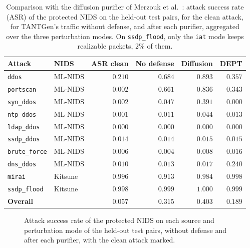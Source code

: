 \begin{table}[t]
\centering
\caption[Comparison with the diffusion purifier of Merzouk et al.]{Comparison with the
diffusion purifier of Merzouk et al.~\cite{merzouk2024diffusion}: attack success rate
(ASR) of the protected NIDS on the held-out test pairs, for the clean attack, for
TANTGen's traffic without defense, and after each purifier, aggregated over the three
perturbation modes. On \texttt{ssdp\_flood}, only the \texttt{iat} mode keeps realizable
packets, $2\%$ of them.}
\label{tab:eval-sota}
\setlength{\tabcolsep}{5pt}
\begin{tabular}{llrrrr}
\toprule
\textbf{Attack} & \textbf{NIDS} & \textbf{ASR clean} & \textbf{No defense} & \textbf{Diffusion} & \textbf{DEPT} \\
\midrule
\texttt{ddos}         & ML-NIDS & $0.210$ & $0.684$ & $0.893$ & $0.357$ \\
\texttt{portscan}     & ML-NIDS & $0.002$ & $0.661$ & $0.836$ & $0.343$ \\
\texttt{syn\_ddos}    & ML-NIDS & $0.002$ & $0.047$ & $0.391$ & $0.000$ \\
\texttt{ntp\_ddos}    & ML-NIDS & $0.001$ & $0.011$ & $0.044$ & $0.013$ \\
\texttt{ldap\_ddos}   & ML-NIDS & $0.000$ & $0.000$ & $0.000$ & $0.000$ \\
\texttt{ssdp\_ddos}   & ML-NIDS & $0.014$ & $0.014$ & $0.015$ & $0.015$ \\
\texttt{brute\_force} & ML-NIDS & $0.006$ & $0.004$ & $0.008$ & $0.016$ \\
\texttt{dns\_ddos}    & ML-NIDS & $0.010$ & $0.013$ & $0.017$ & $0.240$ \\
\texttt{mirai}        & Kitsune & $0.996$ & $0.913$ & $0.984$ & $0.998$ \\
\texttt{ssdp\_flood}  & Kitsune & $0.998$ & $0.999$ & $1.000$ & $0.999$ \\
\midrule
\textbf{Overall}      &         & $\mathbf{0.057}$ & $\mathbf{0.315}$ & $\mathbf{0.403}$ & $\mathbf{0.189}$ \\
\bottomrule
\end{tabular}
\end{table}

\begin{figure}[t]
    \centering
    
    \caption[DEPT's purifier against the diffusion purifier, per source and mode.]{Attack
    success rate of the protected NIDS on each source and perturbation mode of the
    held-out test pairs, without defense and after each purifier, with the clean attack
    marked.}
    \label{fig:eval-sota}
\end{figure}

